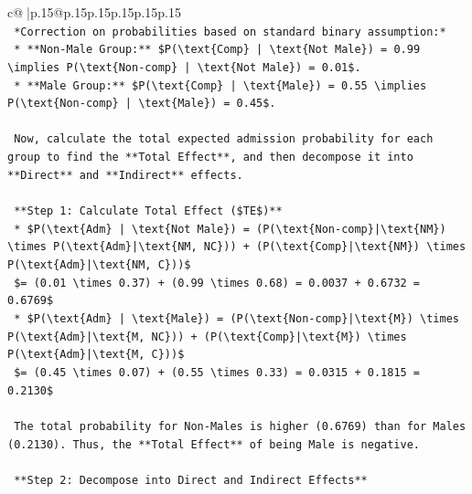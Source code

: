 \documentclass{article}
\begin{document}
{\begin{supertabular}{c@{$\;$}|p{.15\linewidth}@{}p{.15\linewidth}p{.15\linewidth}p{.15\linewidth}p{.15\linewidth}p{.15\linewidth}}
{{{\\ 
\texttt{    *Correction on probabilities based on standard binary assumption:*} \\
\texttt{    *   **Non{-}Male Group:** \$P(\textbackslash{}text\{Comp\} | \textbackslash{}text\{Not Male\}) = 0.99 \textbackslash{}implies P(\textbackslash{}text\{Non{-}comp\} | \textbackslash{}text\{Not Male\}) = 0.01\$.} \\
\texttt{    *   **Male Group:** \$P(\textbackslash{}text\{Comp\} | \textbackslash{}text\{Male\}) = 0.55 \textbackslash{}implies P(\textbackslash{}text\{Non{-}comp\} | \textbackslash{}text\{Male\}) = 0.45\$.} \\
\\ 
\texttt{    Now, calculate the total expected admission probability for each group to find the **Total Effect**, and then decompose it into **Direct** and **Indirect** effects.} \\
\\ 
\texttt{    **Step 1: Calculate Total Effect (\$TE\$)**} \\
\texttt{    *   \$P(\textbackslash{}text\{Adm\} | \textbackslash{}text\{Not Male\}) = (P(\textbackslash{}text\{Non{-}comp\}|\textbackslash{}text\{NM\}) \textbackslash{}times P(\textbackslash{}text\{Adm\}|\textbackslash{}text\{NM, NC\})) + (P(\textbackslash{}text\{Comp\}|\textbackslash{}text\{NM\}) \textbackslash{}times P(\textbackslash{}text\{Adm\}|\textbackslash{}text\{NM, C\}))\$} \\
\texttt{        \$= (0.01 \textbackslash{}times 0.37) + (0.99 \textbackslash{}times 0.68) = 0.0037 + 0.6732 = 0.6769\$} \\
\texttt{    *   \$P(\textbackslash{}text\{Adm\} | \textbackslash{}text\{Male\}) = (P(\textbackslash{}text\{Non{-}comp\}|\textbackslash{}text\{M\}) \textbackslash{}times P(\textbackslash{}text\{Adm\}|\textbackslash{}text\{M, NC\})) + (P(\textbackslash{}text\{Comp\}|\textbackslash{}text\{M\}) \textbackslash{}times P(\textbackslash{}text\{Adm\}|\textbackslash{}text\{M, C\}))\$} \\
\texttt{        \$= (0.45 \textbackslash{}times 0.07) + (0.55 \textbackslash{}times 0.33) = 0.0315 + 0.1815 = 0.2130\$} \\
\\ 
\texttt{    The total probability for Non{-}Males is higher (0.6769) than for Males (0.2130). Thus, the **Total Effect** of being Male is negative.} \\
\\ 
\texttt{    **Step 2: Decompose into Direct and Indirect Effects**} \\
}}}
\end{supertabular}}
\end{document}
